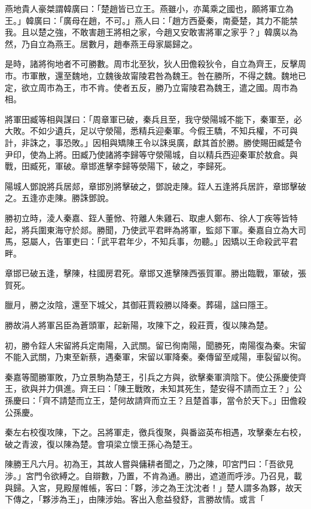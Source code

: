 \begin{pinyinscope}
燕地貴人豪桀謂韓廣曰：「楚趙皆已立王。燕雖小，亦萬乘之國也，願將軍立為王。」韓廣曰：「廣母在趙，不可。」燕人曰：「趙方西憂秦，南憂楚，其力不能禁我。且以楚之強，不敢害趙王將相之家，今趙又安敢害將軍之家乎？」韓廣以為然，乃自立為燕王。居數月，趙奉燕王母家屬歸之。

是時，諸將徇地者不可勝數。周市北至狄，狄人田儋殺狄令，自立為齊王，反擊周市。市軍散，還至魏地，立魏後故甯陵君咎為魏王。咎在勝所，不得之魏。魏地已定，欲立周市為王，市不肯。使者五反，勝乃立甯陵君為魏王，遣之國。周市為相。

將軍田臧等相與謀曰：「周章軍已破，秦兵且至，我守滎陽城不能下，秦軍至，必大敗。不如少遺兵，足以守滎陽，悉精兵迎秦軍。今假王驕，不知兵權，不可與計，非誅之，事恐敗。」因相與矯陳王令以誅吳廣，獻其首於勝。勝使賜田臧楚令尹印，使為上將。田臧乃使諸將李歸等守滎陽城，自以精兵西迎秦軍於敖倉。與戰，田臧死，軍破。章邯進擊李歸等滎陽下，破之，李歸死。

陽城人鄧說將兵居郯，章邯別將擊破之，鄧說走陳。銍人五逢將兵居許，章邯擊破之。五逢亦走陳。勝誅鄧說。

勝初立時，淩人秦嘉、銍人董惞、符離人朱雞石、取慮人鄭布、徐人丁疾等皆特起，將兵圍東海守於郯。勝聞，乃使武平君畔為將軍，監郯下軍。秦嘉自立為大司馬，惡屬人，告軍吏曰：「武平君年少，不知兵事，勿聽。」因矯以王命殺武平君畔。

章邯已破五逢，擊陳，柱國房君死。章邯又進擊陳西張賀軍。勝出臨戰，軍破，張賀死。

臘月，勝之汝陰，還至下城父，其御莊賈殺勝以降秦。葬碭，諡曰隱王。

勝故涓人將軍呂臣為蒼頭軍，起新陽，攻陳下之，殺莊賈，復以陳為楚。

初，勝令銍人宋留將兵定南陽，入武關。留已徇南陽，聞勝死，南陽復為秦。宋留不能入武關，乃東至新蔡，遇秦軍，宋留以軍降秦。秦傳留至咸陽，車裂留以徇。

秦嘉等聞勝軍敗，乃立景駒為楚王，引兵之方與，欲擊秦軍濟陰下。使公孫慶使齊王，欲與并力俱進。齊王曰：「陳王戰敗，未知其死生，楚安得不請而立王？」公孫慶曰：「齊不請楚而立王，楚何故請齊而立王？且楚首事，當令於天下。」田儋殺公孫慶。

秦左右校復攻陳，下之。呂將軍走，徼兵復聚，與番盜英布相遇，攻擊秦左右校，破之青波，復以陳為楚。會項梁立懷王孫心為楚王。

陳勝王凡六月。初為王，其故人嘗與傭耕者聞之，乃之陳，叩宮門曰：「吾欲見涉。」宮門令欲縛之。自辯數，乃置，不肯為通。勝出，遮道而呼涉。乃召見，載與歸。入宮，見殿屋帷帳，客曰：「夥，涉之為王沈沈者！」楚人謂多為夥，故天下傳之，「夥涉為王」，由陳涉始。客出入愈益發舒，言勝故情。或言「


\end{pinyinscope}
